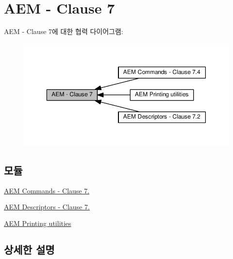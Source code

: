 \hypertarget{group__aem}{}\section{A\+EM -\/ Clause 7}
\label{group__aem}
A\+EM -\/ Clause 7에 대한 협력 다이어그램\+:
\nopagebreak
\begin{figure}[H]
\begin{center}
\leavevmode
\includegraphics[width=350pt]{group__aem}
\end{center}
\end{figure}
\subsection*{모듈}
\begin{DoxyCompactItemize}
\item 
\hyperlink{group__aem__command}{A\+E\+M Commands -\/ Clause 7.}
\item 
\hyperlink{group__aem__descriptor}{A\+E\+M Descriptors -\/ Clause 7.}
\item 
\hyperlink{group__aem__print}{A\+E\+M Printing utilities}
\end{DoxyCompactItemize}


\subsection{상세한 설명}
